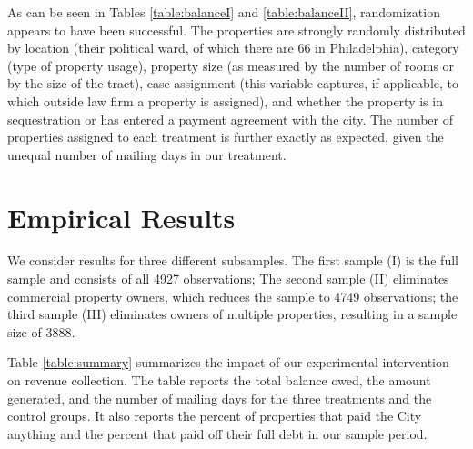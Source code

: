 \documentclass[12pt,titlepage]{article}
\begin{document}
As can be seen in Tables \ref{table:balanceI} and
\ref{table:balanceII}, randomization appears to have been successful.
The properties are strongly randomly distributed by location (their
political ward, of which there are 66 in Philadelphia), category (type
of property usage), property size (as measured by the number of rooms
or by the size of the tract), case assignment (this variable
captures, if applicable, to which outside law firm a property is
assigned), and whether the property is in sequestration or has entered a
payment agreement with the city. The number of properties assigned to
each treatment is further exactly as expected, given the unequal
number of mailing days in our treatment.


\section{Empirical Results}


We consider results for three different subsamples.
The first sample (I) is the full sample
and consists of all 4927 observations; The second sample (II) eliminates
commercial property owners, which reduces the sample to 4749
observations; the third sample (III) eliminates owners of multiple
properties, resulting in a sample size of 3888.

Table \ref{table:summary} summarizes the impact of our experimental
intervention on revenue collection.  The table reports the total
balance owed, the amount generated, and the number of mailing days for
the three treatments and the control groups. It also reports the
percent of properties that paid the City anything and the percent
that paid off their full debt in our sample period.
\end{document}
